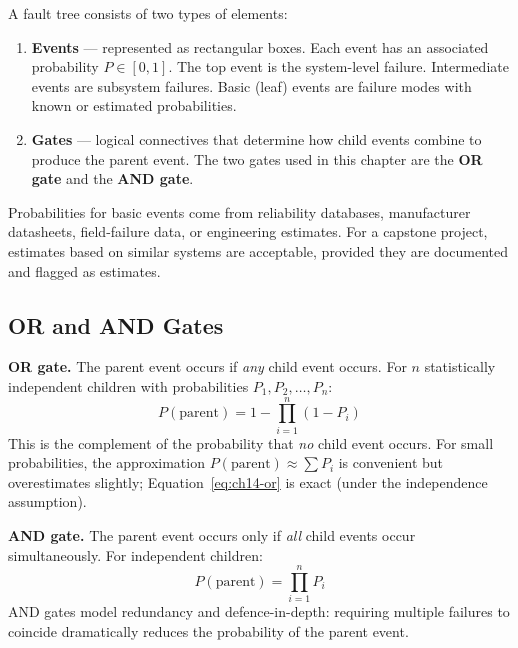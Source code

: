 A fault tree consists of two types
of elements:
\begin{enumerate}
  \item \textbf{Events} --- represented as rectangular boxes.
        Each event has an associated probability $P \in [0, 1]$.
        The top event is the system-level failure.
        Intermediate events are subsystem failures.
        Basic (leaf) events are failure modes with known or estimated probabilities.
  \item \textbf{Gates} --- logical connectives that determine how child events combine
        to produce the parent event.
        The two gates used in this chapter are the \textbf{OR gate} and the
        \textbf{AND gate}.
\end{enumerate}

Probabilities for basic events
come from reliability databases, manufacturer datasheets, field-failure data, or
engineering estimates.
For a capstone project, estimates based on similar systems are acceptable, provided they
are documented and flagged as estimates.

\subsection{OR and AND Gates}
\label{subsec:ch14-gates}

\textbf{OR gate.}
The parent event occurs if \emph{any} child event occurs.
For $n$ statistically independent children with probabilities $P_1, P_2, \ldots, P_n$:
\begin{equation}
  P(\text{parent}) = 1 - \prod_{i=1}^{n}(1 - P_i)
  \label{eq:ch14-or}
\end{equation}
This is the complement of the probability that \emph{no} child event occurs.
For small probabilities, the approximation $P(\text{parent}) \approx \sum P_i$ is
convenient but overestimates slightly; Equation~\ref{eq:ch14-or} is exact (under the
independence assumption).

\textbf{AND gate.}
The parent event occurs only if \emph{all} child events occur simultaneously.
For independent children:
\begin{equation}
  P(\text{parent}) = \prod_{i=1}^{n} P_i
  \label{eq:ch14-and}
\end{equation}
AND gates model redundancy and defence-in-depth: requiring multiple failures to coincide
dramatically reduces the probability of the parent event.

